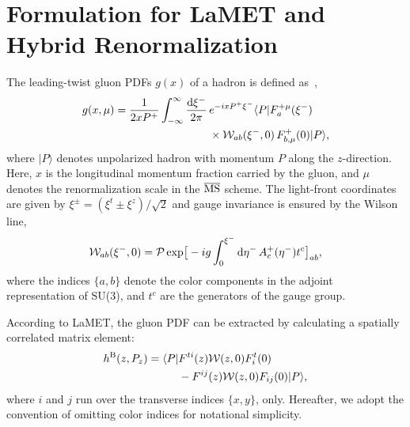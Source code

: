 \section{Formulation for LaMET and Hybrid Renormalization}
\label{sec:analytic}

The leading-twist gluon PDFs $g(x)$ of a hadron is defined as~\cite{Collins:1989gx},
%
\begin{align}\label{eq:LCPDF}
g(x,\mu) = \frac{1}{ 2 x P^+} \int_{-\infty}^\infty \frac{\mathrm{d} \xi^-}{2\pi} \,& e^{-i x P^+ \xi^-} \langle P | F_a^{+\mu}(\xi^-) \notag\\
&
 \times \mathcal{W}_{ab}(\xi^-, 0) \, F_{b,\mu}^+(0) | P \rangle,
\end{align}
where $|P\rangle$ denotes unpolarized hadron with momentum $P$ along the $z$-direction.  Here, $x$ is the longitudinal momentum fraction carried by the gluon, and $\mu$ denotes the renormalization scale in the $\overline{\rm MS}$ scheme. The light-front coordinates are given by $\xi^\pm=(\xi^t\pm \xi^z)/\sqrt{2}$ and gauge invariance is ensured by the Wilson line,
\begin{align}
\mathcal{W}_{ab}(\xi^-, 0)= \mathcal{P}\,{\rm exp}\big[ -i g \int_0^{\xi^-} \mathrm{d} \eta^- \, A_c^+(\eta^-) t^c \big]_{ab},
\end{align}
where the indices $\{a,b\}$ denote the color components in the adjoint representation of SU(3), and $t^c$ are the generators of the gauge group.

According to LaMET, the gluon PDF can be extracted by calculating a spatially correlated matrix element:
\begin{align}
h^{\text{B}}(z,P_z)= \langle P | &F^{ti}(z)\mathcal{W}(z,0)F^t_{i}(0) \notag\\
&-F^{ij}(z)\mathcal{W}(z,0)F_{ij}(0)| P \rangle,
\end{align}
where $i$ and $j$ run over the transverse indices $\{x,y\}$, only.
Hereafter, we adopt the convention of omitting color indices for notational simplicity.

